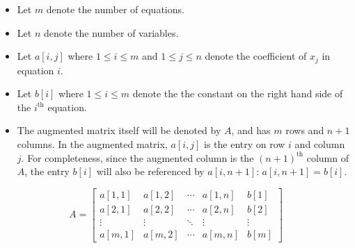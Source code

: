 \documentclass{article}
\begin{document}
\begin{itemize} 
\item Let \(m\) denote the number of equations. 
\item Let \(n\) denote the number of variables. 
\item Let \(a[i,j]\) where \(1 \leq i \leq m\) and \(1 \leq j \leq n\) denote the coefficient of \(x_j\) in equation \(i\). 
\item Let \(b[i]\) where \(1 \leq i \leq m\) denote the the constant on the right hand side of the \(i^{\text{th}}\) equation. 
\item The augmented matrix itself will be denoted by \(A\), and has \(m\) rows and \(n + 1\) columns. In the augmented matrix, \(a[i,j]\) is the entry on row \(i\) and column \(j\). For completeness, since the augmented column is the \((n + 1)^{\text{th}}\) column of \(A\), the entry \(b[i]\) will also be referenced by \(a[i, n+1]\): \(a[i,n+1] = b[i]\). 
\end{itemize}

\[A = \left[\begin{array}{cccc|c}
a[1,1] & a[1,2] & \cdots & a[1,n] & b[1] \\ 
a[2,1] & a[2,2] & \cdots & a[2,n] & b[2] \\
\vdots & \vdots & \ddots & \vdots & \vdots \\
a[m,1] & a[m,2] & \cdots & a[m,n] & b[m] 
\end{array}\right]\]

%
\end{document}
